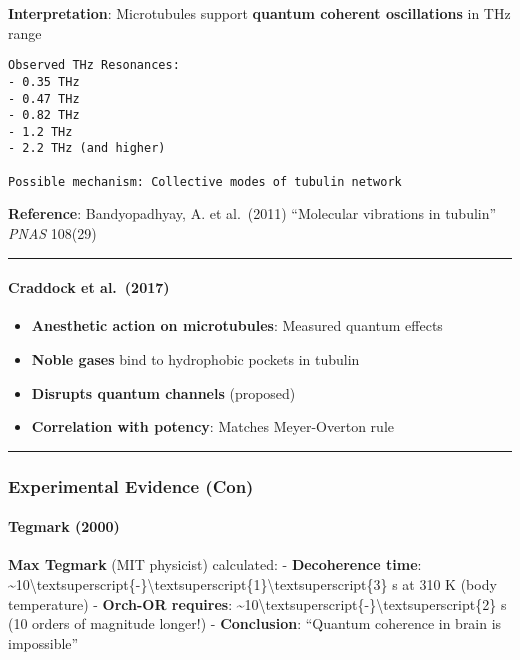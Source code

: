 \textbf{Interpretation}: Microtubules support \textbf{quantum coherent
oscillations} in THz range

\begin{verbatim}
Observed THz Resonances:
- 0.35 THz
- 0.47 THz
- 0.82 THz
- 1.2 THz
- 2.2 THz (and higher)

Possible mechanism: Collective modes of tubulin network
\end{verbatim}

\textbf{Reference}: Bandyopadhyay, A. et al.~(2011) ``Molecular
vibrations in tubulin'' \emph{PNAS} 108(29)

\begin{center}\rule{0.5\linewidth}{0.5pt}\end{center}

\paragraph{Craddock et al.~(2017)}\label{craddock-et-al.-2017}

\begin{itemize}
\tightlist
\item
  \textbf{Anesthetic action on microtubules}: Measured quantum effects
\item
  \textbf{Noble gases} bind to hydrophobic pockets in tubulin
\item
  \textbf{Disrupts quantum channels} (proposed)
\item
  \textbf{Correlation with potency}: Matches Meyer-Overton rule
\end{itemize}

\begin{center}\rule{0.5\linewidth}{0.5pt}\end{center}

\subsubsection{Experimental Evidence
(Con)}\label{experimental-evidence-con}

\paragraph{Tegmark (2000)}\label{tegmark-2000}

\textbf{Max Tegmark} (MIT physicist) calculated: - \textbf{Decoherence
time}:
\textasciitilde10\textbackslash textsuperscript\{-\}\textbackslash textsuperscript\{1\}\textbackslash textsuperscript\{3\}
s at 310 K (body temperature) - \textbf{Orch-OR requires}:
\textasciitilde10\textbackslash textsuperscript\{-\}\textbackslash textsuperscript\{2\}
s (10 orders of magnitude longer!) - \textbf{Conclusion}: ``Quantum
coherence in brain is impossible''

